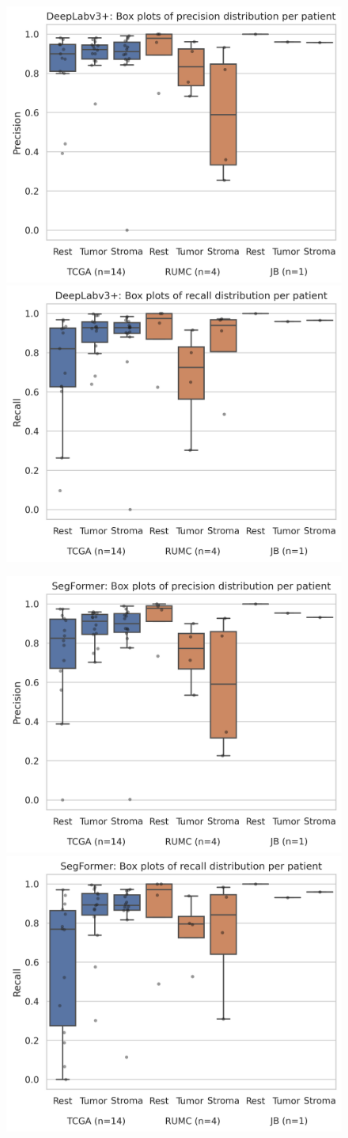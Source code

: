 \begin{figure}
\includegraphics[width=.5\linewidth]{figures/tissue/deeplabv3+_prec_patient_wsirois.png}
\includegraphics[width=.5\linewidth]{figures/tissue/deeplabv3+_recall_patient_wsirois.png}

\includegraphics[width=.5\linewidth]{figures/tissue/segformer_prec_patient_wsirois.png}
\includegraphics[width=.5\linewidth]{figures/tissue/segformer_recall_patient_wsirois.png}


\end{figure}
